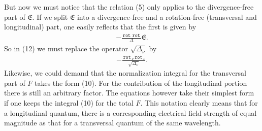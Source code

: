 \documentclass[a4paper,11pt]{article}
\newcommand{\?}[2]{#1\footnote{\textsc{Translator note}: #2}}
\newcommand{\nequ}[2]{\begin{align*}\tag{#1}#2\end{align*}}
\newcommand{\uequ}[1]{\begin{align*}#1\end{align*}}
\renewcommand{\operatorfont}[1]{\texttt{#1}}
\newcommand{\rot}{\,\operatorfont{rot}\,}
\newcommand{\mf}[1]{\mathfrak{#1}}
\begin{document}
But now we must notice that the relation (5) only applies to the divergence-free part of $\mf{E}$. If we split $\mf{E}$ into a divergence-free and a rotation-free (transversal and longitudinal) part, one easily reflects that the first is given by 
\uequ{
-\frac{\rot\rot}{\Delta}\mf{E}.
}
So in (12) we must replace the operator $\sqrt{\Delta_\nu}$ by
\nequ{19}{
-\frac{\rot_\nu \rot_\nu}{\sqrt{\Delta_\nu}}.
}
Likewise, we could demand that the normalization integral for the transversal part of $F$ takes the form (10). For the contribution of the longitudinal portion there is still an arbitrary factor. The equations however take their simplest form if 
one keeps the integral (10) for the total $F$. This notation clearly means that for a longitudinal quantum, there is a corresponding electrical field strength of equal magnitude as that for a transversal quantum of the same wavelength.
\end{document}

